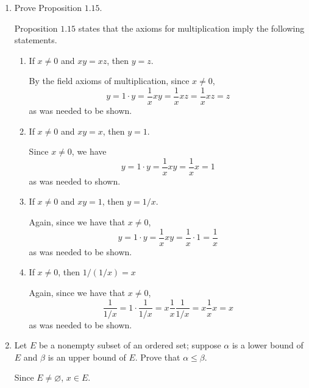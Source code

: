 \begin{enumerate}
\begin{align*}
    &= 2^2\cdot 3(q_1^{2\beta_1}\cdot q_2^{2\beta_2}\cdots q_n^{2\beta_n})
      \eqnumtag\label{ch1prob2}
  \end{align*}
  Let \(p_k^{2\alpha_k}\) be \(3^{2\alpha_k}\) and \(q_m = 3^{2\beta_m}\).
  Then by \cref{ch1prob2}
  \begin{align*}
    3^{2\alpha_k} &= 3\cdot 3^{2\beta_m}\\
                  &= 3^{2\beta_m + 1}
  \end{align*}
  Therefore, \(2\alpha_k = 2\beta_m + 1\) which is a contradiction since an
  even number can never be an odd number.
  That is, there is no rational number whose square is \(12\).
\item
  Prove Proposition \(1.15\).
  \par\smallskip
  Proposition \(1.15\) states that the axioms for multiplication imply the
  following statements.
  \begin{enumerate}[label = (\alph*)]
  \item
    If \(x\neq 0\) and \(xy = xz\), then \(y = z\).
    \par\smallskip
    By the field axioms of multiplication, since \(x\neq 0\),
    \[
    y = 1\cdot y = \frac{1}{x}xy = \frac{1}{x}xz = \frac{1}{x}xz = z
    \]
    as was needed to be shown.
  \item
    If \(x\neq 0\) and \(xy = x\), then \(y = 1\).
    \par\smallskip
    Since \(x\neq 0\), we have
    \[
    y = 1\cdot y = \frac{1}{x}xy = \frac{1}{x}x = 1
    \]
    as was needed to shown.
  \item
    If \(x\neq 0\) and \(xy = 1\), then \(y = 1/x\).
    \par\smallskip
    Again, since we have that \(x\neq 0\),
    \[
    y = 1\cdot y = \frac{1}{x}xy = \frac{1}{x}\cdot 1 = \frac{1}{x}
    \]
    as was needed to be shown.
  \item
    If \(x\neq 0\), then \(1/(1/x) = x\)
    \par\smallskip
    Again, since we have that \(x\neq 0\),
    \[
    \frac{1}{1/x} = 1\cdot\frac{1}{1/x} = x\frac{1}{x}\frac{1}{1/x} =
    x\frac{1}{x}x = x
    \]
    as was needed to be shown.
  \end{enumerate}
\item
  Let \(E\) be a nonempty subset of an ordered set; suppose \(\alpha\) is a
  lower bound of \(E\) and \(\beta\) is an upper bound of \(E\).
  Prove that \(\alpha\leq\beta\).
  \par\smallskip
  Since \(E\neq\varnothing\), \(x\in E\).

\end{enumerate}
